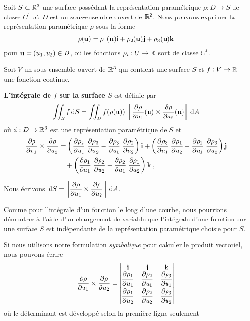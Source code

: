{Soit $S \subset \mathbb{R}^3$ une surface possédant la représentation
paramétrique $\rho:D\rightarrow S$ de classe $C^1$ où $D$ est un
sous-ensemble ouvert de $\mathbb{R}^2$.  Nous pouvons exprimer la représentation
paramétrique $\rho$ sous la forme
\begin{equation} \label{para_surf}
\rho(\mathbf{u}) = \rho_1(\mathbf{u})\mathbf{i} + \rho_2(\mathbf{u})\mathbf{j} + \rho_3(\mathbf{u})\mathbf{k}
\end{equation}
pour $ \mathbf{u} = (u_1,u_2) \in D$, où les fonctions
$\rho_i:U \rightarrow \mathbb{R}$ sont de classe $C^1$.

\begin{defn}
Soit $V$ un sous-ensemble ouvert de $\mathbb{R}^3$ qui contient une surface $S$ et
$f:V\rightarrow \mathbb{R}$ une fonction continue.

{\bfseries L'intégrale de $f$ sur la surface $S$} est définie par
\[
\iint_S  f \,\mathrm{d}S
= \iint_D f(\rho(\mathbf{u}))\;
\left\|\frac{\partial \rho}{\partial u_1}(\mathbf{u}) \times
\frac{\partial \rho}{\partial u_2}(\mathbf{u})\right\| \,\mathrm{d}A
\]
où $\phi:D \to \mathbb{R}^3$ est une représentation paramétrique de $S$ et
\begin{equation*}
\begin{split}
\frac{\partial \rho}{\partial u_1} \times \frac{\partial \rho}{\partial u_2} &
= \left( \frac{\partial \rho_2}{\partial u_1} \; \frac{\partial \rho_3}{\partial u_2} -
\frac{\partial \rho_3}{\partial u_1} \; \frac{\partial \rho_2}{\partial u_2} \right) \mathbf{i} +
\left( \frac{\partial \rho_3}{\partial u_1} \; \frac{\partial \rho_1}{\partial u_2} 
- \frac{\partial \rho_1}{\partial u_1} \; \frac{\partial \rho_3}{\partial u_2} \right) \mathbf{j} \\
&\quad + \left( \frac{\partial \rho_1}{\partial u_1}\; \frac{\partial \rho_2}{\partial u_2}
- \frac{\partial \rho_2}{\partial u_1}\; \frac{\partial \rho_1}{\partial u_2} \right) \mathbf{k} \; ,
\end{split}
\end{equation*}

Nous écrivons
$\displaystyle \,\mathrm{d}S =
\left\| \frac{\partial \rho}{\partial u_1} \times \frac{\partial \rho}{\partial u_2} \right\|
\,\mathrm{d}A$.
\end{defn}

\begin{rmk}
Comme pour l'intégrale d'un fonction le long d'une courbe, nous
pourrions démontrer à l'aide d'un changement de variable
que l'intégrale d'une fonction sur une surface $S$ est
indépendante de la représentation paramétrique choisie pour $S$.
\end{rmk}

\begin{rmk}
Si nous utilisons notre formulation {\em symbolique} pour calculer le produit
vectoriel, nous pouvons écrire
\[
\frac{\partial \rho}{\partial u_1} \times \frac{\partial \rho}{\partial u_2}
= \begin{vmatrix}
\mathbf{i} & \mathbf{j} & \mathbf{k} \\
\displaystyle \frac{\partial \rho_1}{\partial u_1} & \displaystyle \frac{\partial \rho_2}{\partial u_1} &
\displaystyle \frac{\partial \rho_3}{\partial u_1} \\[0.8em]
\displaystyle \frac{\partial \rho_1}{\partial u_2} & \displaystyle \frac{\partial \rho_2}{\partial u_2} &
\displaystyle \frac{\partial \rho_3}{\partial u_2} \end{vmatrix}
\]
où le déterminant est développé selon la première ligne seulement.
\end{rmk}

}
